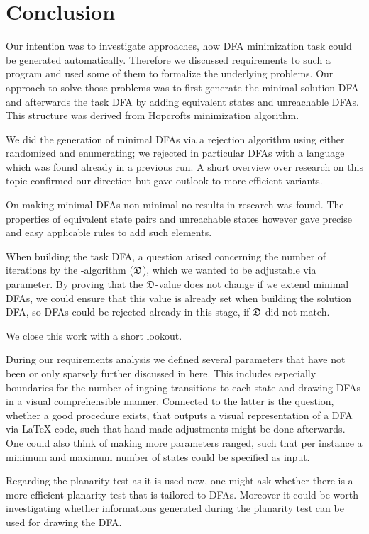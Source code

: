 
\chapter{Conclusion}

Our intention was to investigate approaches, how DFA minimization task could be generated automatically. Therefore we discussed requirements to such a program and used some of them to formalize the underlying problems. Our approach to solve those problems was to first generate the minimal solution DFA and afterwards the task DFA by adding equivalent states and unreachable DFAs. This structure was derived from Hopcrofts minimization algorithm.

We did the generation of minimal DFAs via a rejection algorithm using either randomized and enumerating; we rejected in particular DFAs with a language which was found already in a previous run. A short overview over research on this topic confirmed our direction but gave outlook to more efficient variants.

On making minimal DFAs non-minimal no results in research was found. The properties of equivalent state pairs and unreachable states however gave precise and easy applicable rules to add such elements.

When building the task DFA, a question arised concerning the number of iterations by the \CompDist-algorithm ($\mathfrak{D}$), which we wanted to be adjustable via parameter. By proving that the $\mathfrak{D}$-value does not change if we extend minimal DFAs, we could ensure that this value is already set when building the solution DFA, so DFAs could be rejected already in this stage, if $\mathfrak{D}$ did not match.

We close this work with a short lookout.

During our requirements analysis we defined several parameters that have not been or only sparsely further discussed in here. This includes especially boundaries for the number of ingoing transitions to each state and drawing DFAs in a visual comprehensible manner. Connected to the latter is the question, whether a good procedure exists, that outputs a visual representation of a DFA via \LaTeX-code, such that hand-made adjustments might be done afterwards. One could also think of making more parameters ranged, such that per instance a minimum and maximum number of states could be specified as input.

Regarding the planarity test as it is used now, one might ask whether there is a more efficient planarity test that is tailored to DFAs. Moreover it could be worth investigating whether informations generated during the planarity test can be used for drawing the DFA.

